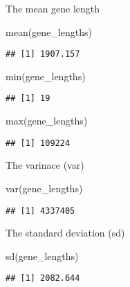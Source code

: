 \documentclass[
]{book}
\newenvironment{Shaded}{\begin{snugshade}}{\end{snugshade}}
\newcommand{\FunctionTok}[1]{\textcolor[rgb]{0.00,0.00,0.00}{#1}}
\newcommand{\NormalTok}[1]{#1}
\begin{document}
The mean gene length

\begin{Shaded}
\begin{Highlighting}[]
\FunctionTok{mean}\NormalTok{(gene\_lengths)}
\end{Highlighting}
\end{Shaded}

\begin{verbatim}
## [1] 1907.157
\end{verbatim}

\begin{Shaded}
\begin{Highlighting}[]
\FunctionTok{min}\NormalTok{(gene\_lengths)}
\end{Highlighting}
\end{Shaded}

\begin{verbatim}
## [1] 19
\end{verbatim}

\begin{Shaded}
\begin{Highlighting}[]
\FunctionTok{max}\NormalTok{(gene\_lengths)}
\end{Highlighting}
\end{Shaded}

\begin{verbatim}
## [1] 109224
\end{verbatim}

The varinace (var)

\begin{Shaded}
\begin{Highlighting}[]
\FunctionTok{var}\NormalTok{(gene\_lengths)}
\end{Highlighting}
\end{Shaded}

\begin{verbatim}
## [1] 4337405
\end{verbatim}

The standard deviation (sd)

\begin{Shaded}
\begin{Highlighting}[]
\FunctionTok{sd}\NormalTok{(gene\_lengths)}
\end{Highlighting}
\end{Shaded}

\begin{verbatim}
## [1] 2082.644
\end{verbatim}
\end{document}
